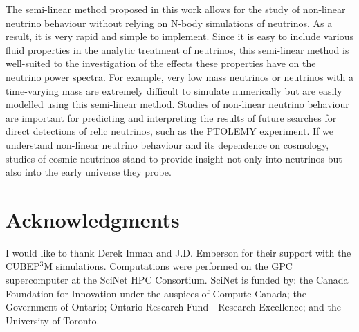 \documentclass[twocolumn,superscriptaddress,prd]{revtex4}
\newcommand{\ptolemy}{PTOLEMY }
\begin{document}
The semi-linear method proposed in this work allows for the study of
non-linear neutrino behaviour without relying on
N-body simulations of neutrinos.  As a result, it is very rapid and simple to
implement.
Since it is easy to include various fluid properties in 
the analytic treatment of neutrinos, 
this semi-linear method is well-suited to the investigation of
the effects these properties have on the neutrino power spectra. 
For example, very low mass neutrinos or neutrinos with a time-varying
mass are extremely difficult to simulate numerically but are easily
modelled using this semi-linear method.
Studies of
non-linear neutrino behaviour are important for predicting and
interpreting the results of future searches for 
direct detections of relic neutrinos, such as the
\ptolemy experiment.  If we understand non-linear neutrino behaviour
and its dependence on cosmology,
studies of cosmic neutrinos stand to provide insight not only into
neutrinos but also into the early universe they probe. 





\section*{ Acknowledgments }
I would like to thank Derek Inman
and J.D. Emberson for their support with
the CUBEP$^3$M simulations.
Computations were performed on the GPC supercomputer at the SciNet HPC
Consortium.  SciNet is funded by: the Canada Foundation for
Innovation under the auspices of Compute Canada; the Government of
Ontario; Ontario Research Fund - Research Excellence; and the
University of Toronto.
\end{document}
